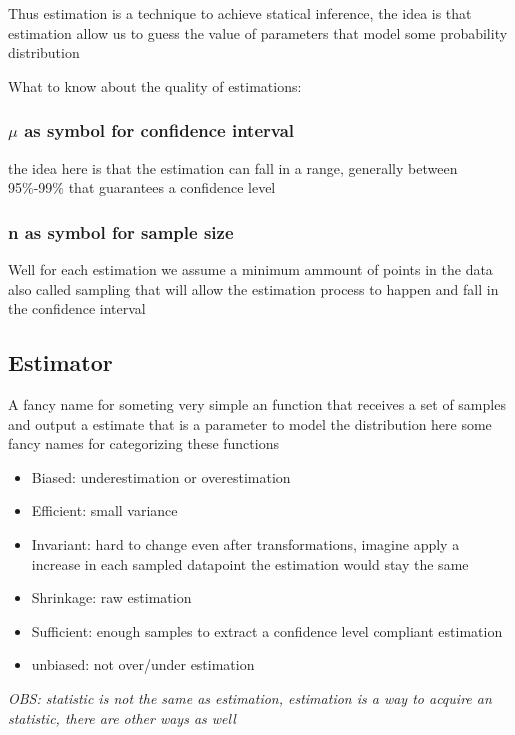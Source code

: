 Thus estimation is a technique to achieve statical inference, the idea is that estimation allow us to guess the value of parameters that model some probability distribution

What to know about the quality of estimations:

\subsubsection{$\mu$ as symbol for confidence interval}

the idea here is that the estimation can fall in a range, generally between 95\%-99\% that guarantees a confidence level

\subsubsection{n as symbol for sample size}

Well for each estimation we assume a minimum ammount of points in the data also called sampling that will allow the estimation process to happen and fall in the confidence interval

\cite{notesEstimation}

\subsection{Estimator}

A fancy name for someting very simple an function that receives a set of samples and output a estimate that is a parameter to model the distribution
here some fancy names for categorizing these functions

\begin{itemize}
	\item Biased: underestimation or overestimation
	\item Efficient: small variance
	\item Invariant: hard to change even after transformations, imagine apply a increase in each sampled datapoint the estimation would stay the same
	\item Shrinkage: raw estimation
	\item Sufficient: enough samples to extract a confidence level compliant estimation
	\item  unbiased: not over/under estimation
\end{itemize}
\textit{OBS: statistic is not the same as estimation, estimation is a way to acquire an statistic, there are other ways as well}
\cite{howto}

